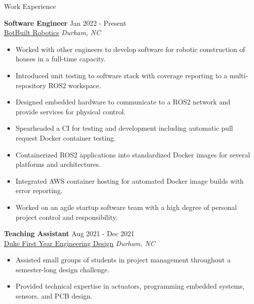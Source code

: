 \documentclass{resume}
\begin{document}
\begin{rSection}{Work Experience}

\textbf{Software Engineer} \hfill Jan 2022 - Present\\
\href{https://botbuilt.com}{BotBuilt Robotics} \hfill \textit{Durham, NC}
\begin{itemize}
    \itemsep -3pt {} 
    \item Worked with other engineers to develop software for robotic construction of houses in a full-time capacity.
    \item Introduced unit testing to software stack with coverage reporting to a multi-repository ROS2 workspace.
    \item Designed embedded hardware to communicate to a ROS2 network and provide services for physical control.
    \item Spearheaded a CI for testing and development including automatic pull request Docker container testing.
    \item Containerized ROS2 applications into standardized Docker images for several platforms and architectures.
    \item Integrated AWS container hosting for automated Docker image builds with error reporting.
    \item Worked on an agile startup software team with a high degree of personal project control and responsibility.
    \end{itemize}
 
\textbf{Teaching Assistant} \hfill Aug 2021 - Dec 2021\\
\href{https://fyd.duke.edu/}{Duke First Year Engineering Design} \hfill \textit{Durham, NC}
\begin{itemize}
    \itemsep -3pt {} 
    \item Assisted small groups of students in project management throughout a semester-long design challenge.
    \item Provided technical expertise in actuators, programming embedded systems, sensors, and PCB design.\
\end{itemize}

\end{rSection} 

\end{document}
